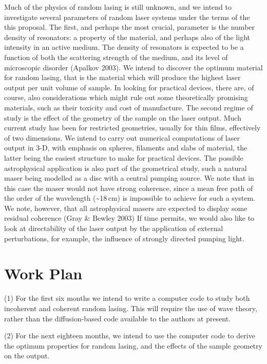 Much of the physics of random lasing is still unknown, and we intend to
investigate several parameters of random laser systems under the terms of
the this proposal. The first, and perhaps the most crucial, parameter is
the number density of resonators: a property of the material, and perhaps
also of the light intensity in an active medium. The density of resonators
is expected to be a function of both the scattering strength of the medium,
and its level of microscopic disorder (Apalkov 2003). We intend to discover
the optimum material for random lasing, that is the material which will
produce the highest laser output per unit volume of sample. In looking for
practical devices, there are, of course, also considerations which might
rule out some theoretically promising materials, such as their toxicity and
cost of manufacture. The second regime of study is the effect of the 
geometry of the sample on the laser output. Much current study has been for
restricted geometries, usually for thin films, effectively of two dimensions.
We intend to carry out numerical computations of laser output in 3-D, with
emphasis on spheres, filaments and slabs of material, the latter being the
easiest structure to make for practical devices. The possible astrophysical
application is also part of the geometrical study, such a natural maser
being modelled as a disc with a central pumping source. We note that in
this case the maser would not have strong coherence, since a mean free path
of the order of the wavelength (\sim 18\,cm) is impossible to achieve for
such a system. We note, however, that all astrophysical masers are expected
to display some residual coherence (Gray \& Bewley 2003)
If time permits, we would also like to look at directability
of the laser output by the application of external perturbations, for 
example, the influence of strongly directed pumping light.

\section{Work Plan}

(1) For the first six months we intend to write a computer code to study both
incoherent and coherent random lasing. This will require the use of wave
theory, rather than the diffusion-based code available to the authors at
present. 

(2) For the next eighteen months, we intend to use the computer code to derive
the optimum properties for random lasing, and the effects of the sample
geometry on the output.

